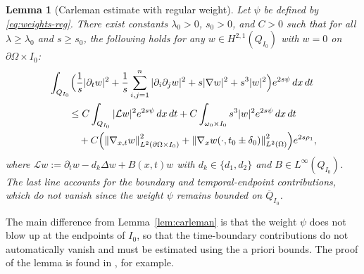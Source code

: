 \documentclass[12pt]{amsart}
\theoremstyle{plain}
\newtheorem{lemma}{Lemma}[section]
\theoremstyle{definition}
\theoremstyle{remark}
\newcommand{\p}{\partial}
\newcommand{\norm}[1]{\left\lVert#1\right\rVert}
\newcommand{\Om}{\Omega}
\newcommand{\Lap}{\Delta}
\begin{document}
\begin{lemma}[Carleman estimate with regular weight]\label{lem:carleman-reg}
Let $\psi$ be defined by \eqref{eq:weights-reg}.
There exist constants $\lambda_0>0$, $s_0>0$, and $C>0$ such that for all
$\lambda\ge\lambda_0$ and $s\ge s_0$, the following holds for any
$w\in H^{2,1}(Q_{I_0})$ with $w=0$ on $\p\Om\times I_0$:
\begin{align}\label{eq:carleman-reg}
&\int_{Q_{I_0}}\Bigl(\frac{1}{s}|\p_t w|^2
+\frac{1}{s}\sum_{i,j=1}^n|\p_i\p_j w|^2
+s|\nabla w|^2+s^3|w|^2\Bigr)e^{2s\psi}\,dx\,dt\notag\\
&\qquad\le C\int_{Q_{I_0}}|\mathcal{L}w|^2 e^{2s\psi}\,dx\,dt
+C\int_{\omega_0\times I_0}s^3|w|^2 e^{2s\psi}\,dx\,dt\notag\\
&\qquad\quad
+C\Bigl(\norm{\nabla_{x,t}w}_{L^2(\p\Om\times I_0)}^2
+\norm{\nabla_x w(\cdot,t_0\pm\delta_0)}_{L^2(\Om)}^2\Bigr)
e^{2s\rho_1},
\end{align}
where $\mathcal{L}w:=\p_t w-d_k\Lap w+B(x,t)w$ with
$d_k\in\{d_1,d_2\}$ and $B\in L^\infty(Q_{I_0})$.
The last line accounts for the boundary and temporal-endpoint
contributions, which do not vanish since the weight $\psi$ remains
bounded on $\overline{Q}_{I_0}$.
\end{lemma}

The main difference from Lemma~\ref{lem:carleman} is that the weight $\psi$
does not blow up at the endpoints of $I_0$, so that the time-boundary
contributions do not automatically vanish and must be estimated using the
a priori bounds.
The proof of the lemma is found in \cite[Theorem~4.3.2]
{Y25}, for example.
\end{document}

